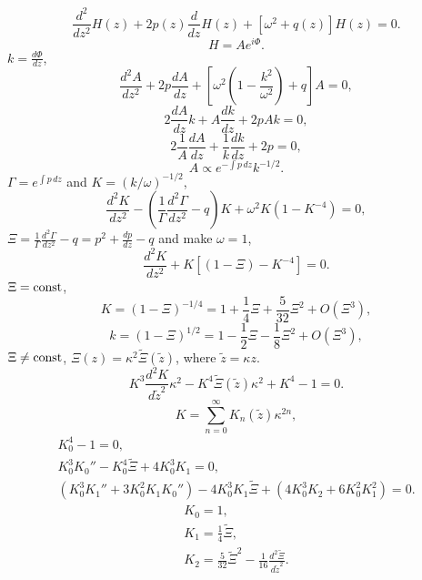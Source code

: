 \begin{equation}
    \frac{d^2}{d z^2}H(z)+2p(z)\frac{d}{d z}H(z)+\left[\omega^2+q(z)\right]H(z)=0.\label{dessoleq}
\end{equation}
\begin{equation}\label{HAphi}
    H=Ae^{i\Phi}.
\end{equation}
$k=\frac{d \Phi}{d z}$,
\begin{equation}\label{rpart}
    \frac{d^2 A}{d z^2}+2p\frac{d A}{d z}+\left[\omega^2\left(1-\frac{k^2}{\omega^2}\right)+q\right]A=0,
\end{equation}
\begin{equation}\label{ipart}
    2\frac{d A}{d z}k+A\frac{d k}{d z}+2pAk=0,
\end{equation}
\begin{equation}
    2\frac{1}{A}\frac{d A}{d z}+\frac{1}{k}\frac{d k}{d z}+2p=0,
\end{equation}
\begin{equation}\label{Apk}
    A\propto e^{-\int p\,dz}k^{-1/2}.
\end{equation}
$\Gamma=e^{\int p \,dz}$ and $K=(k/\omega)^{-1/2}$,
\begin{equation}\label{equK0}
    \frac{d^2 K}{d z^2}-\left(\frac{1}{\Gamma}\frac{d^2\Gamma}{d z^2}-q\right)K+\omega^2K(1-K^{-4})=0,
\end{equation}
$\Xi=\frac{1}{\Gamma}\frac{d^2\Gamma}{d z^2}-q=p^2+\frac{dp}{dz}-q$ and make $\omega=1$,
\begin{equation}\label{equK}
    \frac{d^2 K}{d z^2}+K[(1-\Xi)-K^{-4}]=0.
\end{equation}
$\Xi=\text{const}$,
\begin{equation}\label{K0}
    K=(1-\Xi)^{-1/4}=1+\frac{1}{4}\Xi+\frac{5}{32}\Xi^2+O(\Xi^3),
\end{equation}
\begin{equation}
    k=(1-\Xi)^{1/2}=1-\frac{1}{2}\Xi-\frac{1}{8}\Xi^2+O(\Xi^3),
\end{equation}
$\Xi\neq\text{const}$, $\Xi(z)=\kappa^2\tilde{\Xi}(\tilde{z})$, where $\tilde{z}=\kappa z$.
\begin{equation}\label{equKs}
    K^3\frac{d^2 K}{d \tilde{z}^2}\kappa^2-K^4\tilde{\Xi}(\tilde{z})\kappa^2+K^4-1=0.
\end{equation}
\begin{equation}\label{K}
    K=\sum_{n=0}^\infty K_n(\tilde{z})\kappa^{2n},
\end{equation}
\begin{gather}
    K_0^4-1=0,\\
    K_0^3K_0''-K_0^4\tilde{\Xi}+4K_0^3K_1=0,\\
    (K_0^3K_1''+3K_0^2K_1K_0'')-4K_0^3K_1\tilde{\Xi}+(4K_0^3K_2+6K_0^2K_1^2)=0.
\end{gather}
\begin{gather}
    K_0=1,\\
    K_1=\frac{1}{4}\tilde{\Xi},\\
    K_2=\frac{5}{32}\tilde{\Xi}^2-\frac{1}{16}\frac{d^2\tilde{\Xi}}{d\tilde{z}^2}.
\end{gather}


